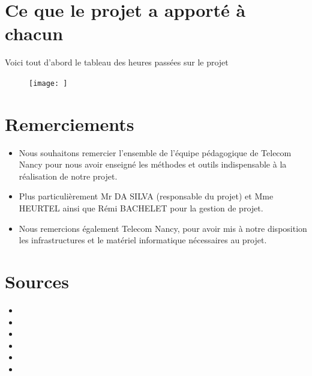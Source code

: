 \documentclass{article}
\begin{document}
\color{orange} \section{ Ce que le projet a apporté à chacun}
\color{purple}

Voici tout d'abord le tableau des heures passées sur le projet

\begin{figure}
    \texttt{[image: ]}
\end{figure}

\color{orange} \section{ Remerciements}
\color{purple}

\begin{itemize}
    \color{purple}
    \item Nous souhaitons remercier l’ensemble de l’équipe pédagogique de Telecom Nancy pour nous avoir enseigné les méthodes et outils indispensable à la réalisation de notre projet.
    \item Plus particulièrement Mr DA SILVA (responsable du projet) et Mme HEURTEL ainsi que Rémi BACHELET pour la gestion de projet.
    \item Nous remercions également Telecom Nancy, pour avoir mis à notre disposition les infrastructures et le matériel informatique nécessaires au projet.
    \end{itemize}

\color{orange} \section{ Sources }
\color{purple}

\begin{itemize}
    \color{purple}
    \item 
    \item
    \item
    \item
    \item
    \item
    \end{itemize}
\end{document}

